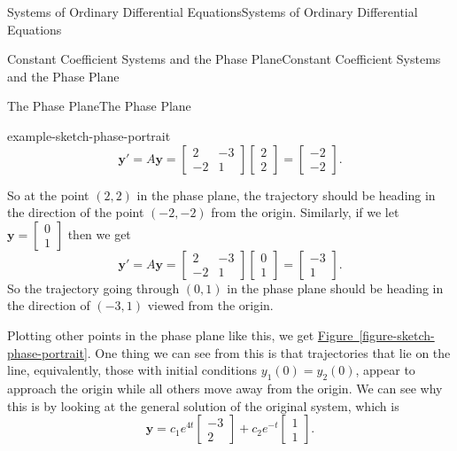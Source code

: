 \documentclass[10pt,]{book}
\numberwithin{equation}{section}
\renewcommand{\vec}[1]{\mathbf{#1}}
\newcommand{\amp}{&}
\begin{document}
\begin{chapterptx}{Systems of Ordinary Differential Equations}{}{Systems of Ordinary Differential Equations}{}{}
\begin{sectionptx}{Constant Coefficient Systems and the Phase Plane}{}{Constant Coefficient Systems and the Phase Plane}{}{}
\begin{subsectionptx}{The Phase Plane}{}{The Phase Plane}{}{}
\begin{example}{}{example-sketch-phase-portrait}
\begin{equation*}
\vec{y}' = A\vec{y} = \begin{bmatrix}2 \amp  -3 \\ -2 \amp  1\end{bmatrix}\begin{bmatrix}2\\2\end{bmatrix} = \begin{bmatrix}-2 \\ -2\end{bmatrix}.
\end{equation*}
%
\par
\hypertarget{p-371}{}%
So at the point \((2,2)\) in the phase plane, the trajectory should be heading in the direction of the point \((-2,-2)\) from the origin. Similarly, if we let \(\vec{y} = \begin{bmatrix}0\\1\end{bmatrix}\) then we get%
\begin{equation*}
\vec{y}' = A\vec{y} = \begin{bmatrix}2 \amp  -3 \\ -2 \amp  1\end{bmatrix}\begin{bmatrix}0\\1\end{bmatrix} = \begin{bmatrix}-3 \\ 1\end{bmatrix}.
\end{equation*}
So the trajectory going through \((0,1)\) in the phase plane should be heading in the direction of \((-3,1)\) viewed from the origin.%
\par
\hypertarget{p-372}{}%
Plotting other points in the phase plane like this, we get \hyperref[figure-sketch-phase-portrait]{Figure~\ref{figure-sketch-phase-portrait}}. One thing we can see from this is that trajectories that lie on the line, equivalently, those with initial conditions \(y_{1}(0) = y_{2}(0)\), appear to approach the origin while all others move away from the origin. We can see why this is by looking at the general solution of the original system, which is%
\begin{equation*}
\vec{y} = c_{1}e^{4t}\begin{bmatrix}-3\\2\end{bmatrix}+c_{2}e^{-t}\begin{bmatrix}1\\1\end{bmatrix}.

\end{equation*}
\end{example}
\end{subsectionptx}
\end{sectionptx}
\end{chapterptx}
\end{document}
